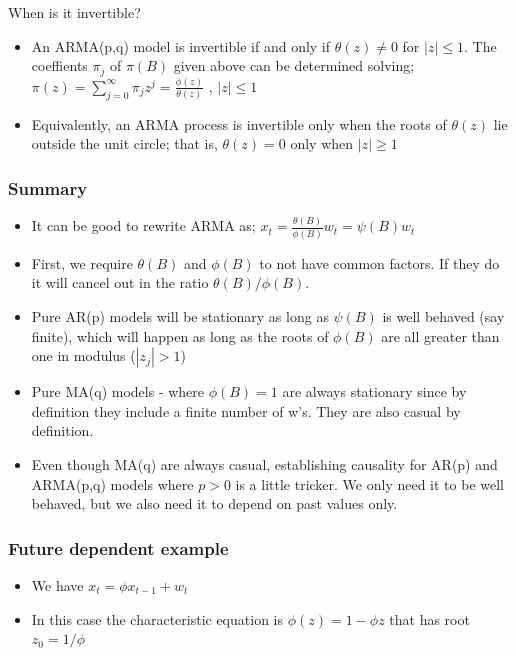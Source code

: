 \documentclass{article}
\begin{document}
\noindent When is it invertible?
\begin{itemize}
    \item An ARMA(p,q) model is invertible if and only if $\theta(z) \neq 0$ for $|z| \leq 1$. The coeffients $\pi_j$ of $\pi(B)$ given above can be determined solving;
    \subitem $\pi(z) = \sum_{j=0}^\infty \pi_j z^j = \frac{\phi(z)}{\theta(z)}$ , $|z| \leq 1$
    \item Equivalently, an ARMA process is invertible only when the roots of $\theta(z)$ lie outside the unit circle; that is, $\theta(z) = 0$ only when $|z| \geq 1$
\end{itemize}

\subsubsection{Summary}
\begin{itemize}
    \item It can be good to rewrite ARMA as;
    \subitem $x_t = \frac{\theta(B)}{\phi(B)}w_t = \psi(B) w_t$
    \item First, we require $\theta(B)$ and $\phi(B)$ to not have common factors. If they do it will cancel out in the ratio $\theta(B)/\phi(B)$.
    \item Pure AR(p) models will be stationary as long as $\psi(B)$ is well behaved (say finite), which will happen as long as the roots of $\phi(B)$ are all greater than one in modulus ($|z_j| > 1$)
    \item Pure MA(q) models - where $\phi(B) = 1$ are always stationary since by definition they include a finite number of w's. They are also casual by definition.
    \item Even though MA(q) are always casual, establishing causality for AR(p) and ARMA(p,q) models where $p>0$ is a little tricker. We only need it to be well behaved, but we also need it to depend on past values only.
\end{itemize}


\subsubsection{Future dependent example}
\begin{itemize}
    \item We have $x_t = \phi x_{t-1} + w_t$
    \item In this case the characteristic equation is $\phi(z) = 1 - \phi z$ that has root $z_0 = 1/\phi$ 
\end{itemize}
\end{document}
